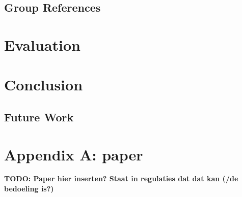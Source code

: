 \documentclass[12pt,a4paper,onecolumn,oneside]{memoir}
\newcommand{\todo}[1]{\textbf{TODO: #1}}
\begin{document}
\section{Group References}

\chapter{Evaluation}


\chapter{Conclusion}

\section{Future Work}



\chapter{Appendix A: paper}

\todo{Paper hier inserten? Staat in regulaties dat dat kan (/de bedoeling is?)}



\end{document}
